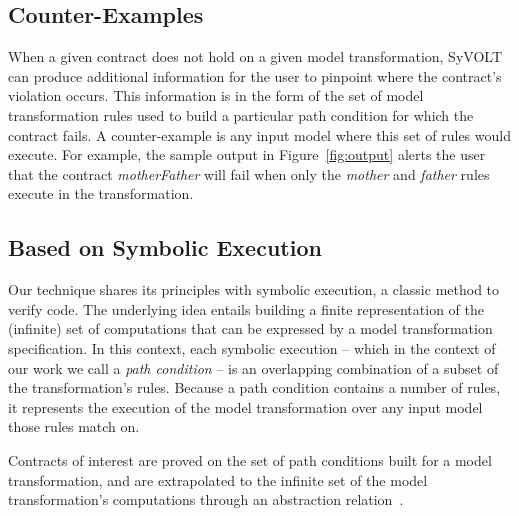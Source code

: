 \subsection{Counter-Examples}

When a given contract does not hold on a given model transformation,
SyVOLT can produce additional information for the user to pinpoint where
the contract's violation occurs. This information is in
the form of the set of model transformation rules used to build a particular
path condition for which the contract fails. A counter-example is any input model where this set of rules would execute. For example, the sample output in Figure~\ref{fig:output} alerts the user that the contract \textit{motherFather} will fail when only the \textit{mother} and \textit{father} rules execute in the transformation.

\subsection{Based on Symbolic Execution}

Our technique shares its principles with symbolic execution, a classic method to
verify code. The underlying idea entails building a finite representation of the
(infinite) set of computations that can be expressed by a model transformation
specification. In this context, each symbolic execution -- which in the context
of our work we call a \emph{path condition} -- is an overlapping combination
of a subset of the transformation's rules. Because a path condition contains a
number of rules, it represents the execution of the model transformation over any input model those rules match on.


Contracts of interest are proved on the set of path conditions built for a
model transformation, and are extrapolated to the infinite set of
the model transformation's computations through an abstraction
relation~\cite{Lucio2014}.




